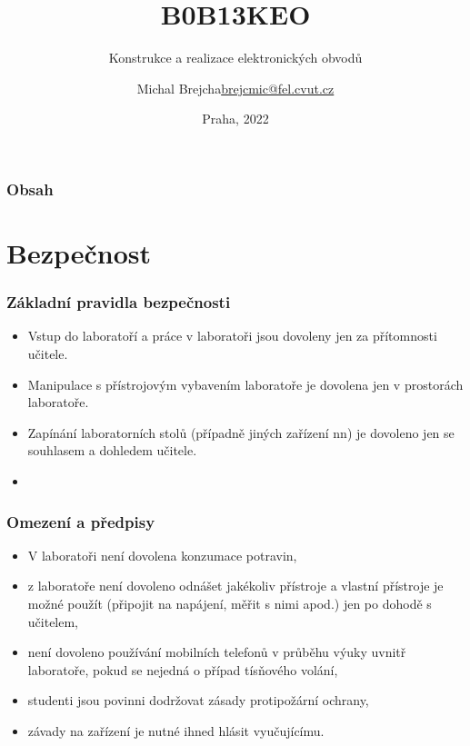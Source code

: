 \documentclass{beamer}
\title[B0B13KEO]{B0B13KEO}
\subtitle[KEO] {Konstrukce a realizace elektronických obvodů}
\author[Brejcha]{\texorpdfstring{Michal Brejcha\newline\url{brejcmic@fel.cvut.cz}}{Michal Brejcha}}
\institute[ČVUT]{ČVUT v Praze, FEL}
\date[Praha, 2022]{Praha, 2022}
\begin{document}
\frame{\titlepage}

\begin{frame}
\frametitle{Obsah} 
\tableofcontents
\end{frame}


\section{\texorpdfstring{Bezpečnost}{Bezpecnost}}
	\begin{frame}
    \frametitle{Základní pravidla bezpečnosti}
		\begin{itemize}
		\item Vstup do laboratoří a práce v laboratoři jsou dovoleny jen za přítomnosti učitele.
		\item Manipulace s přístrojovým vybavením laboratoře je dovolena jen v prostorách laboratoře.
		\item Zapínání laboratorních stolů (případně jiných zařízení nn) je dovoleno jen se souhlasem a dohledem učitele.
		\item \textbf{}
		\end{itemize}
	\end{frame}
	\begin{frame}
    \frametitle{Omezení a předpisy}
		\begin{itemize}
		\item V laboratoři není dovolena konzumace potravin,
    \item z laboratoře není dovoleno odnášet jakékoliv přístroje a vlastní přístroje je možné použít (připojit na napájení, měřit s nimi apod.) jen po dohodě s učitelem,
		\item není dovoleno používání mobilních telefonů v průběhu výuky uvnitř laboratoře, pokud se nejedná o případ tísňového volání,
		\item studenti jsou povinni dodržovat zásady protipožární ochrany,
		\item závady na zařízení je nutné ihned hlásit vyučujícímu.
		\end{itemize}
	\end{frame}
\end{document}
